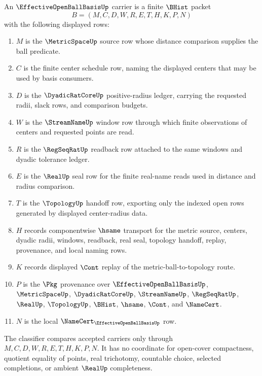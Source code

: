 \begin{definition}
\label{def:effective-open-ball-basis-carrier}
An $\EffectiveOpenBallBasisUp$ carrier is a finite $\BHist$ packet
$$
B=(M,C,D,W,R,E,T,H,K,P,N)
$$
with the following displayed rows:
\begin{enumerate}
\item $M$ is the $\MetricSpaceUp$ source row whose distance comparison supplies the ball predicate.
\item $C$ is the finite center schedule row, naming the displayed centers that may be used by basis consumers.
\item $D$ is the $\DyadicRatCoreUp$ positive-radius ledger, carrying the requested radii, slack rows, and comparison budgets.
\item $W$ is the $\StreamNameUp$ window row through which finite observations of centers and requested points are read.
\item $R$ is the $\RegSeqRatUp$ readback row attached to the same windows and dyadic tolerance ledger.
\item $E$ is the $\RealUp$ seal row for the finite real-name reads used in distance and radius comparison.
\item $T$ is the $\TopologyUp$ handoff row, exporting only the indexed open rows generated by displayed center-radius data.
\item $H$ records componentwise $\hsame$ transport for the metric source, centers, dyadic radii, windows, readback, real seal, topology handoff, replay, provenance, and local naming rows.
\item $K$ records displayed $\Cont$ replay of the metric-ball-to-topology route.
\item $P$ is the $\Pkg$ provenance over $\EffectiveOpenBallBasisUp$, $\MetricSpaceUp$, $\DyadicRatCoreUp$, $\StreamNameUp$, $\RegSeqRatUp$, $\RealUp$, $\TopologyUp$, $\BHist$, $\hsame$, $\Cont$, and $\NameCert$.
\item $N$ is the local $\NameCert_{\EffectiveOpenBallBasisUp}$ row.
\end{enumerate}
The classifier compares accepted carriers only through $M,C,D,W,R,E,T,H,K,P,N$. It has no coordinate for open-cover compactness, quotient equality of points, real trichotomy, countable choice, selected completions, or ambient $\RealUp$ completeness.
\end{definition}

